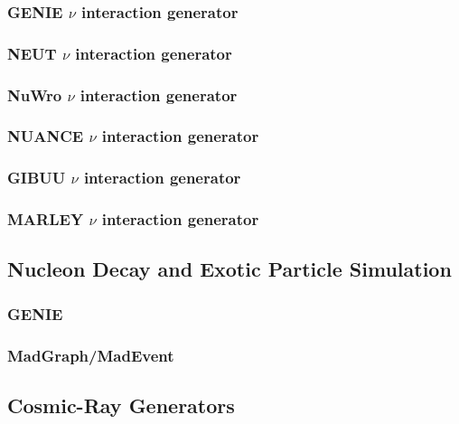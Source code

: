 \subsubsection{GENIE $\nu$ interaction generator}

\subsubsection{NEUT $\nu$ interaction generator}

\subsubsection{NuWro $\nu$ interaction generator}

\subsubsection{NUANCE $\nu$ interaction generator}

\subsubsection{GIBUU $\nu$ interaction generator}

\subsubsection{MARLEY $\nu$ interaction generator}

\subsection{Nucleon Decay and Exotic Particle Simulation}

\subsubsection{GENIE}  %

\subsubsection{MadGraph/MadEvent}

\subsection{Cosmic-Ray Generators}

